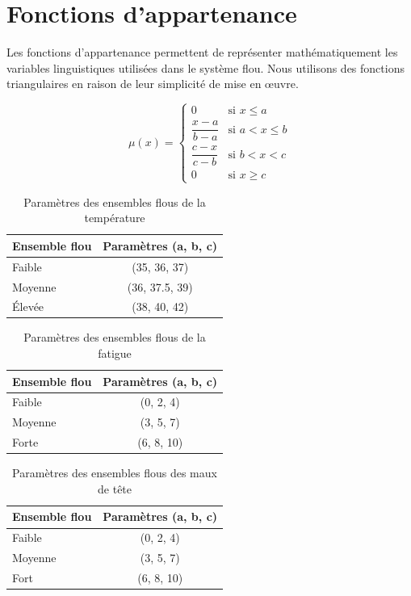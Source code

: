 \documentclass[a4paper,12pt]{report} %
\begin{document}
\section{Fonctions d'appartenance}

Les fonctions d'appartenance permettent de représenter mathématiquement les variables linguistiques utilisées dans le système flou. Nous utilisons des fonctions triangulaires en raison de leur simplicité de mise en œuvre.

\[
\mu(x) = 
\begin{cases}
0 & \text{si } x \leq a \\
\dfrac{x - a}{b - a} & \text{si } a < x \leq b \\[1em]
\dfrac{c - x}{c - b} & \text{si } b < x < c \\
0 & \text{si } x \geq c
\end{cases}
\]

\begin{table}[H]
\centering
\caption{Paramètres des ensembles flous de la température}
\begin{tabular}{|l|c|}
\hline
\textbf{Ensemble flou} & \textbf{Paramètres (a, b, c)} \\
\hline
Faible & (35, 36, 37) \\
Moyenne & (36, 37.5, 39) \\
Élevée & (38, 40, 42) \\
\hline
\end{tabular}
\end{table}

\begin{table}[H]
\centering
\caption{Paramètres des ensembles flous de la fatigue}
\begin{tabular}{|l|c|}
\hline
\textbf{Ensemble flou} & \textbf{Paramètres (a, b, c)} \\
\hline
Faible & (0, 2, 4) \\
Moyenne & (3, 5, 7) \\
Forte & (6, 8, 10) \\
\hline
\end{tabular}
\end{table}

\begin{table}[H]
\centering
\caption{Paramètres des ensembles flous des maux de tête}
\begin{tabular}{|l|c|}
\hline
\textbf{Ensemble flou} & \textbf{Paramètres (a, b, c)} \\
\hline
Faible & (0, 2, 4) \\
Moyenne & (3, 5, 7) \\
Fort & (6, 8, 10) \\
\hline
\end{tabular}
\end{table}
\end{document}
